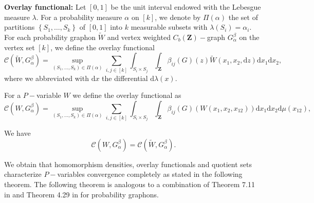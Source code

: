 \documentclass[11pt]{article}
\newcommand{\Space}{\mathbf{Z}}
\newcommand{\CbFunct}{C_b(\Space)}
\begin{document}
\textbf{Overlay functional:}
Let $[0,1]$ be the unit interval endowed with the Lebesgue measure $\lambda.$ For a probability measure $\alpha$ on $[k]$, we denote by $\Pi(\alpha)$ the set of partitions $\left\{S_1, \ldots, S_k\right\}$ of $[0,1]$ into $k$ measurable subsets with $\lambda\left(S_i\right)=\alpha_i$. For each probability graphon  $\widetilde W$ and vertex weighted $\CbFunct-$graph $G_{\alpha}^{\beta}$ on the vertex set $[k]$, we define the overlay functional
\begin{equation}  
\mathcal{C}(\widetilde W, G_{\alpha}^{\beta})=\sup _{\left(S_{ 1}, \ldots, S_k\right) \in \Pi(\alpha)} \sum_{i, j \in[k]}  \int_{S_i \times S_j}\int_{\Space} \beta_{i j}(G)(z)\widetilde W(x_1, x_2,\mathrm{d}z) \mathrm{d} x_1 \mathrm{d} x_2,
\end{equation}
where we abbreviated with $\mathrm{d} x$ the differential $\mathrm{d}\lambda( x ).$

For a $P-$variable $W$ we define the overlay functional as
\begin{equation}  
\mathcal{C}(W, G_{\alpha}^{\beta})=\sup _{\left(S_{ 1}, \ldots, S_k\right) \in \Pi(\alpha)} \sum_{i, j \in[k]}  \int_{S_i \times S_j}\int_{\Space} \beta_{i j}(G)\left(W(x_1, x_2,x_{12})\right) \mathrm{d} x_1 \mathrm{d} x_2 \mathrm{d}\mu(x_{12}),
\end{equation}

We have \begin{equation}\label{Eq:equalityOverlays}
    \mathcal{C}( W, G_{\alpha}^{\beta})=\mathcal{C}(\widetilde W, G_{\alpha}^{\beta}).
\end{equation}

We obtain that homomorphism densities, overlay functionals and quotient sets characterize $P-$variables convergence completely as stated in the following theorem. The following theorem is analogous to a combination of Theorem 7.11 in \cite{abraham2023probabilitygraphons} and Theorem 4.29 in \cite{zucal2024probabilitygraphonsrightconvergence} for probability graphons.
\end{document}
